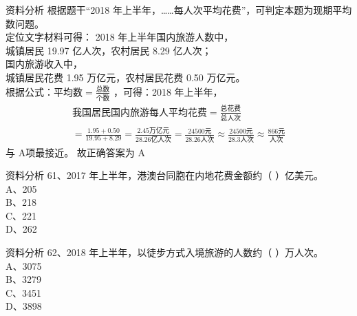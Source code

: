 \documentclass[aspectratio=169]{beamer}
\begin{document}
  \begin{frame}[t]{资料分析}
      根据题干“2018 年上半年，……每人次平均花费”，可判定本题为现期平均数问题。\\
      定位文字材料可得：
      2018 年上半年国内旅游人数中，\\
      城镇居民 19.97 亿人次，农村居民 8.29 亿人次；\\
      国内旅游收入中，\\
      城镇居民花费 1.95 万亿元，农村居民花费 0.50 万亿元。\\
      根据公式：$\text{平均数} = \frac{\text{总数}}{\text{个数}}$ ，可得：2018 年上半年，
      {\small
      \begin{gather}
          \text{我国居民国内旅游每人平均花费}   =  \frac{\text{总花费}}{\text{总人次}}\\
                                                =  \frac{1.95+0.50}{19.95 +8.29}
                                                =  \frac{2.45\text{万亿元}}{28.26\text{亿人次}}
                                                =  \frac{24500\text{元}}{28.26\text{人次}}
                                                \approx  \frac{24500\text{元}}{28.3\text{人次}}
                                                \approx  \frac{866\text{元}}{\text{人次}}
      \end{gather}
      }
      与 A项最接近。
      故正确答案为 A\\
  \end{frame}                           





  \begin{frame}[t]{资料分析}
      61、2017 年上半年，港澳台同胞在内地花费金额约（ ）亿美元。\\
      A、205                                                    \\
      B、218                                                    \\
      C、221                                                    \\
      D、262                                                    \\
  \end{frame}                           



  \begin{frame}[t]{资料分析}
      62、2018 年上半年，以徒步方式入境旅游的人数约（ ）万人次。\\
      A、3075                                                   \\
      B、3279                                                   \\
      C、3451                                                   \\
      D、3898                                                   \\
  \end{frame}                           
\end{document}
